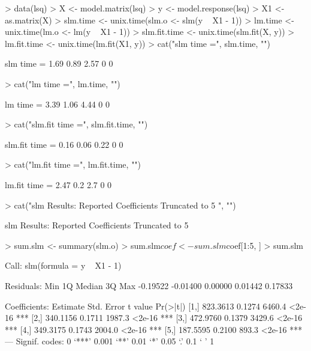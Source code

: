\documentclass{article}
\begin{document}
\begin{Schunk}
\begin{Sinput}
> data(lsq)
> X <- model.matrix(lsq)
> y <- model.response(lsq)
> X1 <- as.matrix(X)
> slm.time <- unix.time(slm.o <- slm(y ~ X1 - 1))
> lm.time <- unix.time(lm.o <- lm(y ~ X1 - 1))
> slm.fit.time <- unix.time(slm.fit(X, y))
> lm.fit.time <- unix.time(lm.fit(X1, y))
> cat("slm time =", slm.time, "\n")
\end{Sinput}
\begin{Soutput}
slm time = 1.69 0.89 2.57 0 0 
\end{Soutput}
\begin{Sinput}
> cat("lm time =", lm.time, "\n")
\end{Sinput}
\begin{Soutput}
lm time = 3.39 1.06 4.44 0 0 
\end{Soutput}
\begin{Sinput}
> cat("slm.fit time =", slm.fit.time, "\n")
\end{Sinput}
\begin{Soutput}
slm.fit time = 0.16 0.06 0.22 0 0 
\end{Soutput}
\begin{Sinput}
> cat("lm.fit time =", lm.fit.time, "\n")
\end{Sinput}
\begin{Soutput}
lm.fit time = 2.47 0.2 2.7 0 0 
\end{Soutput}
\begin{Sinput}
> cat("slm Results: Reported Coefficients Truncated to 5  ", "\n")
\end{Sinput}
\begin{Soutput}
slm Results: Reported Coefficients Truncated to 5   
\end{Soutput}
\begin{Sinput}
> sum.slm <- summary(slm.o)
> sum.slm$coef <- sum.slm$coef[1:5, ]
> sum.slm
\end{Sinput}
\begin{Soutput}
Call:
slm(formula = y ~ X1 - 1)

Residuals:
     Min       1Q   Median       3Q      Max 
-0.19522 -0.01400  0.00000  0.01442  0.17833 

Coefficients:
     Estimate Std. Error t value Pr(>|t|)    
[1,] 823.3613     0.1274  6460.4   <2e-16 ***
[2,] 340.1156     0.1711  1987.3   <2e-16 ***
[3,] 472.9760     0.1379  3429.6   <2e-16 ***
[4,] 349.3175     0.1743  2004.0   <2e-16 ***
[5,] 187.5595     0.2100   893.3   <2e-16 ***
---
Signif. codes:  0 `***' 0.001 `**' 0.01 `*' 0.05 `.' 0.1 ` ' 1 


\end{Soutput}
\end{Schunk}
\end{document}
